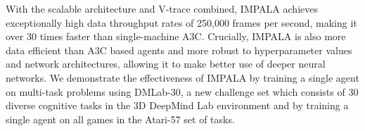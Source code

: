 With the scalable architecture and V-trace combined, IMPALA achieves exceptionally high data throughput rates of 250,000 frames per second, making it over 30 times faster than single-machine A3C.
Crucially, IMPALA is also more data efficient than A3C based agents and more robust to hyperparameter values and network architectures, allowing it to make better use of deeper neural networks.
We demonstrate the effectiveness of IMPALA by training a single agent on multi-task problems using DMLab-30, a new challenge set which consists of 30 diverse cognitive tasks in the 3D DeepMind Lab \cite{beattie2016dmlab} environment and by training a single agent on all games in the Atari-57 set of tasks.


